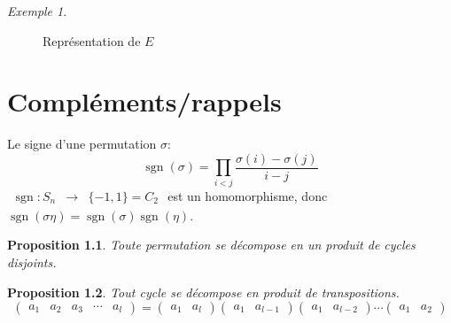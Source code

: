 \documentclass{report}
\newcommand*{\signe}{\operatorname{sgn}}
\newtheorem*{prop}{Proposition}
\theoremstyle{definition}
\theoremstyle{remark}
\newtheorem*{exem}{Exemple}
\begin{document}
\begin{exem}
\begin{figure}[h]
			\qquad
			\caption{Repr\'esentation de $E$}
		\end{figure}
	\end{exem}

	\chapter{Compl\'ements/rappels}
	Le signe d'une permutation $\sigma$:
	\begin{equation*}
		\signe(\sigma) = \prod_{i < j} \dfrac{\sigma(i) - \sigma(j)}{i-j}
	\end{equation*}
	$\begin{array}{rcl}
		\signe:S_n&\to&\{-1,1\} = C_2
	\end{array}$ est un homomorphisme, donc $\signe(\sigma\eta) = \signe(\sigma)\signe(\eta)$.
	\begin{prop}
		Toute permutation se d\'ecompose en un produit de cycles disjoints.
	\end{prop}
	\begin{prop}
		Tout cycle se d\'ecompose en produit de transpositions.
		\[
		\begin{pmatrix}
			a_1&a_2&a_3&\dotsb&a_l
		\end{pmatrix} = \begin{pmatrix}
			a_1&a_l
		\end{pmatrix} \begin{pmatrix}
			a_1&a_{l-1}
		\end{pmatrix} \begin{pmatrix}
			a_1&a_{l-2}
		\end{pmatrix} \dotsb \begin{pmatrix}
			a_1&a_2
		\end{pmatrix}
		\]
	\end{prop}
\end{document}
